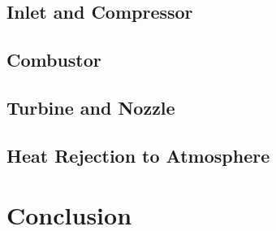 \documentclass[12pt]{IEEEtran}
\begin{document}
\subsection{Inlet and Compressor}
\subsection{Combustor}
\subsection{Turbine and Nozzle}
\subsection{Heat Rejection to Atmosphere}
\section{Conclusion}




\end{document}
